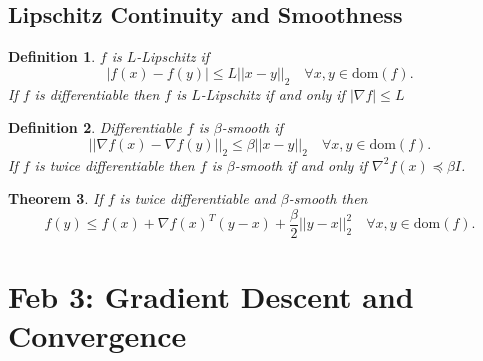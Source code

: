 \documentclass[a4paper]{article}
\newtheorem{thm}{Theorem}[section]
\newtheorem{defn}[thm]{Definition}
\begin{document}
\subsection{Lipschitz Continuity and Smoothness}
\begin{defn}
    $f$ is $L$-Lipschitz if \[
    |f(x)-f(y)|\leq L||x-y||_2 \quad \forall x,y\in \mathrm{dom}(f)
    .\] 
    If $f$ is differentiable then $f$ is $L$-Lipschitz if and only if $|\nabla f|\leq L$ 
\end{defn}
\begin{defn}
    Differentiable $f$ is $\beta$-smooth if \[
    ||\nabla f(x)-\nabla f(y)||_2\leq \beta||x-y||_2 \quad \forall x,y\in \mathrm{dom}(f)
    .\] 
    If $f$ is twice differentiable then $f$ is $\beta$-smooth if and only if $\nabla^2 f(x) \preceq \beta I$.
\end{defn}
\begin{thm}
    If $f$ is twice differentiable and $\beta$-smooth then \[
    f(y)\leq f(x)+\nabla f(x)^T(y-x)+\frac{\beta}{2}||y-x||_2^2 \quad \forall x,y\in \mathrm{dom}(f)
    .\] 

\end{thm}
\newpage
\section{Feb 3: Gradient Descent and Convergence}
\end{document}
